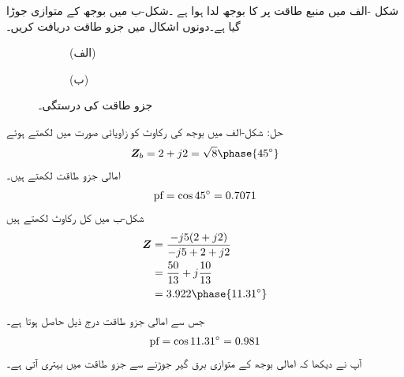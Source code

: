 شکل -الف میں منبع طاقت پر   کا بوجھ لدا ہوا ہے ۔شکل-ب میں بوجھ کے متوازی  جوڑا گیا ہے۔دونوں اشکال میں جزو طاقت دریافت کریں۔
\begin{figure}
\centering
\begin{subfigure}{0.4\textwidth}
\centering
{}
\caption*{(الف)}
\end{subfigure}%
\begin{subfigure}{0.6\textwidth}
\centering
{}
\caption*{(ب)}
\end{subfigure}%
\caption{جزو طاقت کی درستگی۔}
\label{شکل_طاقت_جزو_طاقت_کی_درستگی}
\end{figure}
حل: شکل-الف میں بوجھ  کی رکاوٹ کو زاویائی صورت میں لکھتے  ہوئے
\begin{align*}
\bZ_b=2+j2=\sqrt{8}\phase{45^{\circ}}
\end{align*}
امالی جزو طاقت لکھتے ہیں۔
\begin{align*}
{\ensuremath{{\textup{pf}}}}=\cos 45^{\circ}=0.7071
\end{align*}
شکل-ب میں کل رکاوٹ لکھتے ہیں
\begin{align*}
\bZ&=\frac{-j5(2+j2)}{-j5+2+j2}\\
&=\frac{50}{13}+j\frac{10}{13}\\
&=3.922\phase{11.31^{\circ}}
\end{align*}

جس سے امالی جزو طاقت درج ذیل حاصل ہوتا ہے۔
\begin{align*}
{\ensuremath{{\textup{pf}}}}=\cos 11.31^{\circ}=0.981
\end{align*}
آپ نے دیکھا کہ امالی بوجھ کے متوازی برق گیر جوڑنے سے جزو طاقت میں بہتری آتی ہے۔
